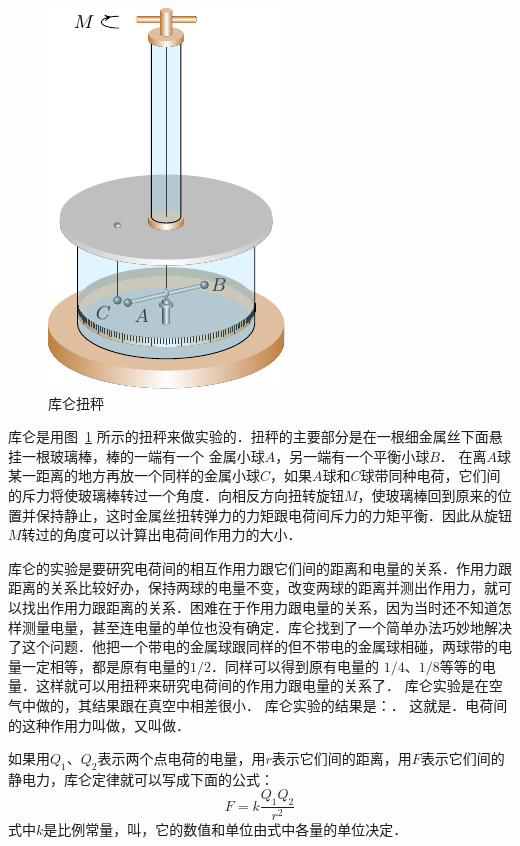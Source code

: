 \begin{figure}[htbp]
    \centering
    \includegraphics{fig/B/6-3.pdf}
    \caption{库仑扭秤}\label{fig_B_6-3}
\end{figure}

库仑是用图~\ref{fig_B_6-3} 所示的扭秤来做实验的．扭秤的主要部分是在一根细金属丝下面悬挂一根玻璃棒，棒的一端有一个
金属小球$A$，另一端有一个平衡小球$B$．
在离$A$球某一距离的地方再放一个同样的金属小球$C$，如果$A$球和$C$球带同种电荷，它们间的斥力将使玻璃棒转过一个角度．向相反方向扭转旋钮$M$，使玻璃棒回到原来的位置并保持静止，这时金属丝扭转弹力的力矩跟电荷间斥力的力矩平衡．因此从旋钮$M$转过的角度可以计算出电荷间作用力的大小．

库仑的实验是要研究电荷间的相互作用力跟它们间的距离和电量的关系．作用力跟距离的关系比较好办，保持两球的电量不变，改变两球的距离并测出作用力，就可以找出作用力跟距离的关系．困难在于作用力跟电量的关系，因为当时还不知道怎样测量电量，甚至连电量的单位也没有确定．库仑找到了一个简单办法巧妙地解决了这个问题．他把一个带电的金属球跟同样的但不带电的金属球相碰，两球带的电量一定相等，都是原有电量的$1/2$．同样可以得到原有电量的
$1/4$、$1/8$等等的电量．这样就可以用扭秤来研究电荷间的作用力跟电量的关系了．
库仑实验是在空气中做的，其结果跟在真空中相差很小．
库仑实验的结果是：．
这就是．电荷间的这种作用力叫做，又叫做．

如果用$Q_1$、$Q_2$表示两个点电荷的电量，用$r$表示它们间的距离，用$F$表示它们间的静电力，库仑定律就可以写成下面的公式：
\begin{equation}\label{eq_B-6-1}
F=k\frac{Q_1Q_2}{r^2}
\end{equation}
式中$k$是比例常量，叫，它的数值和单位由式中各量的单位决定．

